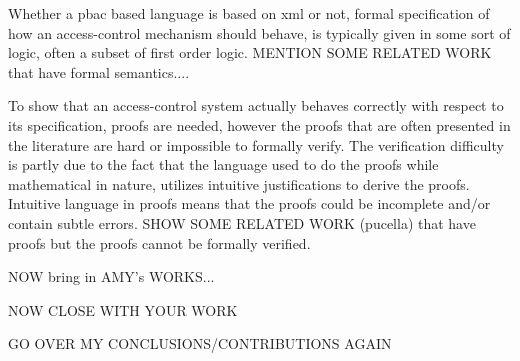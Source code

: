 Whether a \ac{pbac} based language is based on \ac{xml} or not, formal specification of how an access-control mechanism should behave, is typically given in some sort of logic, often a subset of first order logic. MENTION SOME RELATED WORK that have formal semantics....

To show that an access-control system actually behaves correctly with respect to its specification, proofs are needed, however the proofs that are often presented in the literature are hard or impossible to formally verify. The verification difficulty is partly due to the fact that the language used to do the proofs while mathematical in nature, utilizes intuitive justifications to derive the proofs. Intuitive language in proofs means that the proofs could be incomplete and/or contain subtle errors. SHOW SOME RELATED WORK (pucella) that have proofs but the proofs cannot be formally verified.


NOW bring in AMY's WORKS...

NOW CLOSE WITH YOUR WORK


GO OVER MY CONCLUSIONS/CONTRIBUTIONS AGAIN





























